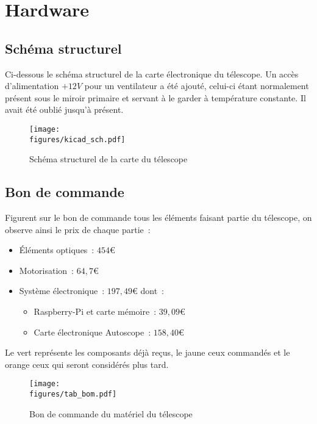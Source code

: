 \chapter{Hardware}

\section{Schéma structurel}

Ci-dessous le schéma structurel de la carte électronique du télescope. Un accès d'alimentation $+12V$ pour un ventilateur a été ajouté, celui-ci étant normalement présent sous le miroir primaire et servant à le garder à température constante. Il avait été oublié jusqu'à présent.

\begin{figure}[H]
    \centering
    \texttt{[image: \\figures/kicad\_sch.pdf]}
    \decoRule
    \caption[
    Schéma structurel de la carte du télescope]{
    Schéma structurel de la carte du télescope}
    \label{fig:Schéma structurel de la carte du télescope}
    \end{figure}

\newpage
\section{Bon de commande}

Figurent sur le bon de commande tous les éléments faisant partie du télescope, on observe ainsi le prix de chaque partie~:
\begin{itemize}[label=$\bullet$]
	\item Éléments optiques~: $454$€
	\item Motorisation~: $64,7$€
	\item Système électronique~: $197,49$€ dont~:
	\begin{itemize}
		\item Raspberry-Pi et carte mémoire~: $39,09$€
		\item Carte électronique Autoscope~: $158,40$€
		\end{itemize}
	\end{itemize}

\vspace{1cm}

Le vert représente les composants déjà reçus, le jaune ceux commandés et le orange ceux qui seront considérés plus tard.

\begin{figure}[H]
    \centering
    \texttt{[image: \\figures/tab\_bom.pdf]}
    \decoRule
    \caption[
    Bon de commande du matériel du télescope]{
    Bon de commande du matériel du télescope}
    \label{fig:Bon de commande du matériel du télescope}
    \end{figure}

